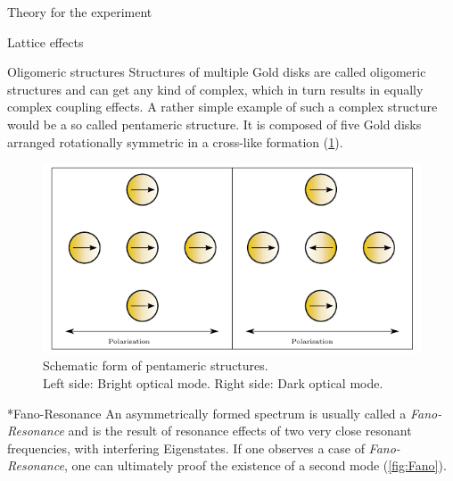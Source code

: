 \documentclass[pdftex, a4paper,11pt, twoside, UKenglish]{report}
\begin{document}
\begin{chapter}{Theory for the experiment}
\begin{section}{Lattice effects}
      
    \end{section}
    
    
    
    \begin{section}{Oligomeric structures}
      \label{chp:TheoryOligomerics}
      Structures of multiple Gold disks are called oligomeric structures and can
      get any kind of complex, which in turn results in equally complex coupling
      effects. A rather simple example of such a complex structure would be a
      so called pentameric structure. It is composed of five Gold disks arranged
      rotationally symmetric in a cross-like formation (\cref{fig:Pentamers}).
      \begin{figure}[hb!]
        \centering
        \includegraphics[width=.9\textwidth]{Figures/Pentamers.png}
        \caption{Schematic form of pentameric structures. \\
            Left side: Bright optical mode. Right side: Dark optical mode.}
        \label{fig:Pentamers}
      \end{figure}
      
      
      
      \begin{subsection}*{Fano-Resonance}
        An asymmetrically formed spectrum is usually called a
        \textit{Fano-Resonance} and is the result of resonance effects of
        two very close resonant frequencies, with interfering Eigenstates.
        If one observes a case of \textit{Fano-Resonance}, one can
        ultimately proof the existence of a second mode (\cref{fig:Fano}).
  
      \end{subsection}
      
      
      

\end{section}
\end{chapter}
\end{document}
